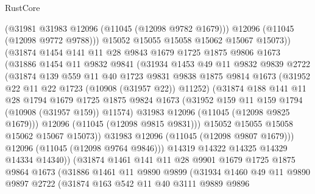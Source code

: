\begin{lexlean}{RustCore}
\begin{coremodule}
                  (@31981 @31983 @12096 (@11045 (@12098 @9782 @1679)))
                  @12096
                  (@11045 (@12098 @9772 @9788)))
                @15052
                @15055
                @15058
                @15062
                @15067
                @15073))
            (@31874
              @1454
              @141
              @11
              @28
              @9843
              @1679
              @1725
              @1875
              @9806
              @1673
              (@31886
                @1454
                @11
                @9832
                @9841
                (@31934
                  @1453
                  @49
                  @11
                  @9832
                  @9839
                  @2722
                  (@31874
                    @139
                    @559
                    @11
                    @40
                    @1723
                    @9831
                    @9838
                    @1875
                    @9814
                    @1673
                    (@31952 @22 @11 @22 @1723 (@10908 (@31957 @22)) @11252)
                    (@31874
                      @188
                      @141
                      @11
                      @28
                      @1794
                      @1679
                      @1725
                      @1875
                      @9824
                      @1673
                      (@31952 @159 @11 @159 @1794 (@10908 (@31957 @159)) @11574)
                      @31983
                      @12096
                      (@11045 (@12098 @9825 @1679)))
                    @12096
                    (@11045 (@12098 @9815 @9831)))
                  @15052
                  @15055
                  @15058
                  @15062
                  @15067
                  @15073))
              @31983
              @12096
              (@11045 (@12098 @9807 @1679)))
            @12096
            (@11045 (@12098 @9764 @9846)))
          @14319
          @14322
          @14325
          @14329
          @14334
          @14340))
      (@31874
        @1461
        @141
        @11
        @28
        @9901
        @1679
        @1725
        @1875
        @9864
        @1673
        (@31886
          @1461
          @11
          @9890
          @9899
          (@31934
            @1460
            @49
            @11
            @9890
            @9897
            @2722
            (@31874
              @163
              @542
              @11
              @40
              @3111
              @9889
              @9896

\end{coremodule}
\end{lexlean}
